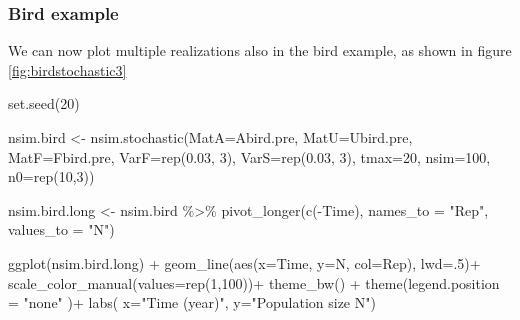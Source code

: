 \documentclass[
]{book}
\newenvironment{Shaded}{\begin{snugshade}}{\end{snugshade}}
\newcommand{\AttributeTok}[1]{\textcolor[rgb]{0.77,0.63,0.00}{#1}}
\newcommand{\DecValTok}[1]{\textcolor[rgb]{0.00,0.00,0.81}{#1}}
\newcommand{\FloatTok}[1]{\textcolor[rgb]{0.00,0.00,0.81}{#1}}
\newcommand{\FunctionTok}[1]{\textcolor[rgb]{0.00,0.00,0.00}{#1}}
\newcommand{\NormalTok}[1]{#1}
\newcommand{\OtherTok}[1]{\textcolor[rgb]{0.56,0.35,0.01}{#1}}
\newcommand{\SpecialCharTok}[1]{\textcolor[rgb]{0.00,0.00,0.00}{#1}}
\newcommand{\StringTok}[1]{\textcolor[rgb]{0.31,0.60,0.02}{#1}}
\begin{document}
\hypertarget{bird-example-18}{%
\subsubsection*{Bird example}\label{bird-example-18}}

We can now plot multiple realizations also in the bird example, as shown in figure \ref{fig:birdstochastic3}

\begin{Shaded}
\begin{Highlighting}[]
\FunctionTok{set.seed}\NormalTok{(}\DecValTok{20}\NormalTok{)}

\NormalTok{nsim.bird }\OtherTok{\textless{}{-}} \FunctionTok{nsim.stochastic}\NormalTok{(}\AttributeTok{MatA=}\NormalTok{Abird.pre,}
                             \AttributeTok{MatU=}\NormalTok{Ubird.pre, }
                             \AttributeTok{MatF=}\NormalTok{Fbird.pre,}
                             \AttributeTok{VarF=}\FunctionTok{rep}\NormalTok{(}\FloatTok{0.03}\NormalTok{, }\DecValTok{3}\NormalTok{), }
                             \AttributeTok{VarS=}\FunctionTok{rep}\NormalTok{(}\FloatTok{0.03}\NormalTok{, }\DecValTok{3}\NormalTok{), }
                             \AttributeTok{tmax=}\DecValTok{20}\NormalTok{, }\AttributeTok{nsim=}\DecValTok{100}\NormalTok{, }
                             \AttributeTok{n0=}\FunctionTok{rep}\NormalTok{(}\DecValTok{10}\NormalTok{,}\DecValTok{3}\NormalTok{))}


\NormalTok{nsim.bird.long }\OtherTok{\textless{}{-}}\NormalTok{ nsim.bird }\SpecialCharTok{\%\textgreater{}\%} \FunctionTok{pivot\_longer}\NormalTok{(}\FunctionTok{c}\NormalTok{(}\SpecialCharTok{{-}}\NormalTok{Time),}
               \AttributeTok{names\_to =} \StringTok{"Rep"}\NormalTok{, }\AttributeTok{values\_to =} \StringTok{"N"}\NormalTok{)}

\FunctionTok{ggplot}\NormalTok{(nsim.bird.long) }\SpecialCharTok{+} 
  \FunctionTok{geom\_line}\NormalTok{(}\FunctionTok{aes}\NormalTok{(}\AttributeTok{x=}\NormalTok{Time, }\AttributeTok{y=}\NormalTok{N, }\AttributeTok{col=}\NormalTok{Rep), }\AttributeTok{lwd=}\NormalTok{.}\DecValTok{5}\NormalTok{)}\SpecialCharTok{+}
  \FunctionTok{scale\_color\_manual}\NormalTok{(}\AttributeTok{values=}\FunctionTok{rep}\NormalTok{(}\DecValTok{1}\NormalTok{,}\DecValTok{100}\NormalTok{))}\SpecialCharTok{+}
  \FunctionTok{theme\_bw}\NormalTok{() }\SpecialCharTok{+}
   \FunctionTok{theme}\NormalTok{(}\AttributeTok{legend.position =} \StringTok{"none"}\NormalTok{ )}\SpecialCharTok{+}
  \FunctionTok{labs}\NormalTok{( }\AttributeTok{x=}\StringTok{"Time (year)"}\NormalTok{, }\AttributeTok{y=}\StringTok{"Population size N"}\NormalTok{) }
\end{Highlighting}
\end{Shaded}
\end{document}
